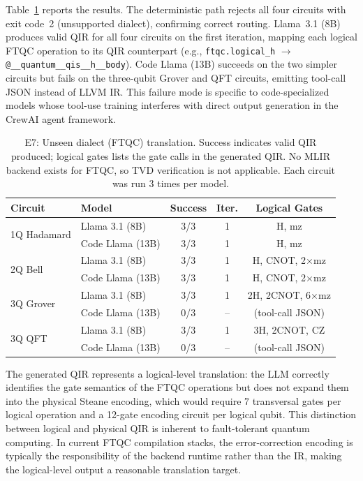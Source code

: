 \documentclass[conference]{IEEEtran}
\begin{document}
Table~\ref{tab:e7} reports the results. The deterministic path rejects all four circuits with exit code~2 (unsupported dialect), confirming correct routing. Llama~3.1 (8B) produces valid QIR for all four circuits on the first iteration, mapping each logical FTQC operation to its QIR counterpart (e.g., \texttt{ftqc.logical\_h} $\to$ \texttt{@\_\_quantum\_\_qis\_\_h\_\_body}). Code Llama (13B) succeeds on the two simpler circuits but fails on the three-qubit Grover and QFT circuits, emitting tool-call JSON instead of LLVM IR. This failure mode is specific to code-specialized models whose tool-use training interferes with direct output generation in the CrewAI agent framework.

\begin{table}[htbp]
\centering
\caption{E7: Unseen dialect (FTQC) translation. Success indicates valid QIR produced; logical gates lists the gate calls in the generated QIR. No MLIR backend exists for FTQC, so TVD verification is not applicable. Each circuit was run 3 times per model.}
\label{tab:e7}
\renewcommand{\arraystretch}{1.1}
\begin{tabular}{@{}llccc@{}}
\toprule
\textbf{Circuit} & \textbf{Model} & \textbf{Success} & \textbf{Iter.} & \textbf{Logical Gates} \\
\midrule
\multirow{2}{*}{1Q Hadamard}  & Llama 3.1 (8B)   & 3/3 & 1 & H, mz \\
                               & Code Llama (13B)  & 3/3 & 1 & H, mz \\
\midrule
\multirow{2}{*}{2Q Bell}      & Llama 3.1 (8B)   & 3/3 & 1 & H, CNOT, 2$\times$mz \\
                               & Code Llama (13B)  & 3/3 & 1 & H, CNOT, 2$\times$mz \\
\midrule
\multirow{2}{*}{3Q Grover}    & Llama 3.1 (8B)   & 3/3 & 1 & 2H, 2CNOT, 6$\times$mz \\
                               & Code Llama (13B)  & 0/3 & -- & (tool-call JSON) \\
\midrule
\multirow{2}{*}{3Q QFT}       & Llama 3.1 (8B)   & 3/3 & 1 & 3H, 2CNOT, CZ \\
                               & Code Llama (13B)  & 0/3 & -- & (tool-call JSON) \\
\bottomrule
\end{tabular}
\end{table}

The generated QIR represents a logical-level translation: the LLM correctly identifies the gate semantics of the FTQC operations but does not expand them into the physical Steane encoding, which would require 7 transversal gates per logical operation and a 12-gate encoding circuit per logical qubit. This distinction between logical and physical QIR is inherent to fault-tolerant quantum computing. In current FTQC compilation stacks, the error-correction encoding is typically the responsibility of the backend runtime rather than the IR, making the logical-level output a reasonable translation target.
\end{document}
